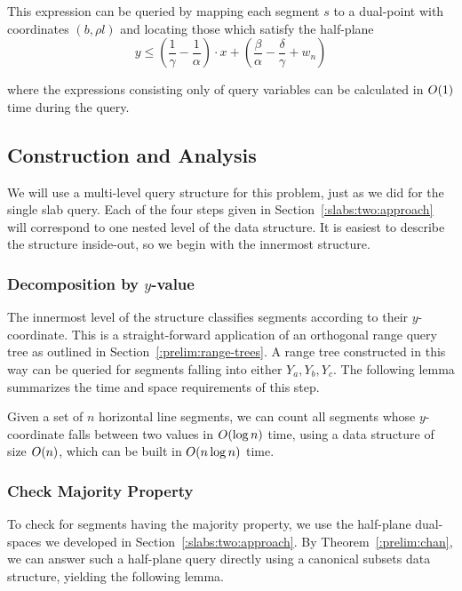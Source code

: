 This expression can be queried by mapping each segment $s$ to a dual-point with coordinates $(b, \rho l)$ and locating those which satisfy the half-plane
\[
y \leq \left ( \frac{1}{\gamma} - \frac{1}{\alpha} \right ) \cdot x + \left ( \frac{\beta}{\alpha} - \frac{\delta}{\gamma} + w_n \right )
\]

\noindent where the expressions consisting only of query variables can be calculated in $O\!\left(1\right)$ time during the query.


\subsection{Construction and Analysis}
\label{:slabs:two:analysis}

We will use a multi-level query structure for this problem, just as we did for the single slab query.
Each of the four steps given in Section~\ref{:slabs:two:approach} will correspond to one nested level of the data structure.
It is easiest to describe the structure inside-out, so we begin with the innermost structure.

\subsubsection{Decomposition by $y$-value}

The innermost level of the structure classifies segments according to their $y$-coordinate. This is a straight-forward application of an orthogonal range query tree as outlined in Section~\ref{:prelim:range-trees}. 
A range tree constructed in this way can be queried for segments falling into either $Y_a, Y_b, Y_c$. 
The following lemma summarizes the time and space requirements of this step.

\begin{lemma}
\label{lem:slabs:two:step1}
Given a set of $n$ horizontal line segments, we can count all segments whose $y$-coordinate falls between two values in $O\!\left(\log{n}\right)$ time, using a data structure of size $O\!\left(n\right)$, which can be built in $O\!\left(n\log{n}\right)$ time.
\end{lemma}


\subsubsection{Check Majority Property}

To check for segments having the majority property, we use the half-plane dual-spaces we developed in Section~\ref{:slabs:two:approach}. By Theorem~\ref{:prelim:chan}, we can answer such a half-plane query directly using a canonical subsets data structure, yielding the following lemma.


